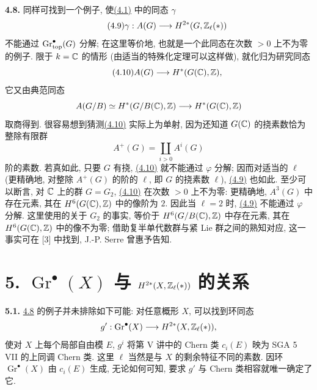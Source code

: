 \noindent{}\textbf{4.8.}
同样可找到一个例子, 使\hyperlink{sga6.e14.eq.4-1}{(4.1)} 中的同态 $\gamma$
\begin{equation}\tag{4.9}
 \gamma:A(G)\longrightarrow H^{2*}(G,\mathbb Z_\ell(*))
\end{equation}
不能通过 $\operatorname{Gr}_{\mathrm{top}}^\bullet(G)$ 分解; 在这里等价地, 也就是一个此同态在次数 $>0$ 上不为零的例子. 限于 $k=\mathbb C$ 的情形 (由适当的特殊化定理可以这样做), 就化归为研究同态
\begin{equation}\tag{4.10}
 A(G)\longrightarrow H^*(G(\mathbb C),\mathbb Z),
\end{equation}
它又由典范同态
\[
 A(G/B)\simeq H^*(G/B(\mathbb C),\mathbb Z)
 \longrightarrow H^*(G(\mathbb C),\mathbb Z)
\]
取商得到. 很容易想到猜测\hyperlink{sga6.e14.eq.4-10}{(4.10)} 实际上为单射, 因为还知道 $G(\mathbb C)$ 的挠素数恰为整除有限群
\[
 A^+(G)=\coprod_{i>0}A^i(G)
\]
阶的素数. 若真如此, 只要 $G$ 有挠, \hyperlink{sga6.e14.eq.4-10}{(4.10)} 就不能通过 $\varphi$ 分解; 因而对适当的 $\ell$ (更精确地, 对整除 $A^+(G)$ 的阶的 $\ell$, 即 $G$ 的挠素数 $\ell$), \hyperlink{sga6.e14.eq.4-9}{(4.9)} 也如此. 至少可以断言, 对 $\mathbb C$ 上的群 $G=G_2$, \hyperlink{sga6.e14.eq.4-10}{(4.10)} 在次数 $>0$ 上不为零: 更精确地, $A^3(G)$ 中存在元素, 其在 $H^6(G(\mathbb C),\mathbb Z)$ 中的像阶为 $2$. 因此当 $\ell=2$ 时, \hyperlink{sga6.e14.eq.4-9}{(4.9)} 不能通过 $\varphi$ 分解. 这里使用的关于 $G_2$ 的事实, 等价于 $H^6(G/B(\mathbb C),\mathbb Z)$ 中存在元素, 其在 $H^6(G(\mathbb C),\mathbb Z)$ 中的像不为零; 借助复半单代数群与紧 Lie 群之间的熟知对应, 这一事实可在 [3] 中找到, J.-P. Serre 曾惠予告知.

\section*{5. $\operatorname{Gr}^\bullet(X)$ 与 $H^{2*}(X,\mathbb Z_\ell(*))$ 的关系}

\noindent{}\textbf{5.1.}
\hyperlink{sga6.e14.para.4-8}{4.8} 的例子并未排除如下可能: 对任意概形 $X$, 可以找到环同态
\[
 g':\operatorname{Gr}^\bullet(X)
 \longrightarrow H^{2*}(X,\mathbb Z_\ell(*)),
\]
使对 $X$ 上每个局部自由模 $E$, $g^i$ 将第 V 讲中的 Chern 类 $c_i(E)$ 映为 SGA 5 VII 的上同调 Chern 类. 这里 $\ell$ 当然是与 $X$ 的剩余特征不同的素数. 因环 $\operatorname{Gr}^\bullet(X)$ 由 $c_i(E)$ 生成, 无论如何可知, 要求 $g'$ 与 Chern 类相容就唯一确定了它.

